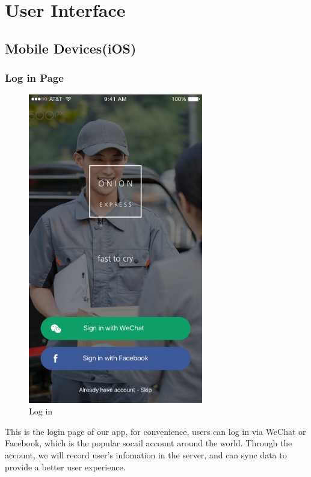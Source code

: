 \documentclass[12pt]{scrreprt}
\begin{document}
\chapter{User Interface}
\section{Mobile Devices(iOS)}
\subsection{Log in Page}
\begin{figure}[htbp]
  \centering\includegraphics[width=3in]{DocumentRes/Login.png}
  \caption{Log in}
\end{figure}
This is the login page of our app, for convenience, users can log in via WeChat or
Facebook, which is the popular socail account around the world. Through the
account, we will record user's infomation in the server, and can sync data to
provide a better user experience.
\end{document}
